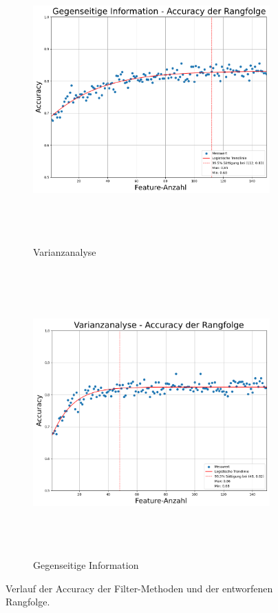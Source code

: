 \begin{figure}[htbp]
     \centering
     \begin{subfigure}[b]{0.9\textwidth}
         \centering
         \includegraphics[width=\textwidth, height=11cm]{img/Plots/Feature Auswahl/Filter-Methoden Mutual Info.png}
         \caption{Varianzanalyse}
     \end{subfigure}
     \hfill
     \begin{subfigure}[b]{0.9\textwidth}
         \centering
         \includegraphics[width=\textwidth, height=11cm]{img/Plots/Feature Auswahl/Filter-Methoden ANOVA.png}
         \caption{Gegenseitige Information}
     \end{subfigure}
     \caption{Verlauf der Accuracy der Filter-Methoden und der entworfenen Rangfolge.}
     \label{fig:plotMethVergl}
\end{figure}


